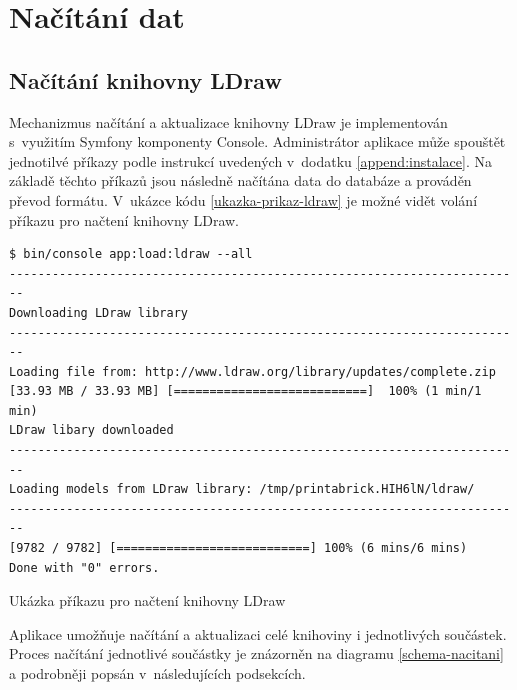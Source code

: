 \section{Načítání dat}

\subsection{Načítání knihovny LDraw}
Mechanizmus načítání a aktualizace knihovny LDraw je implementován s~využitím Symfony komponenty Console. Administrátor aplikace může spouštět jednotilvé příkazy podle instrukcí uvedených v~dodatku \ref{append:instalace}. Na základě těchto příkazů jsou následně načítána data do databáze a prováděn převod formátu. V~ukázce kódu \ref{ukazka-prikaz-ldraw} je možné vidět volání příkazu pro načtení knihovny LDraw.

\begin{listing}[htbp]
        \begin{verbatim}
$ bin/console app:load:ldraw --all
------------------------------------------------------------------------
Downloading LDraw library
------------------------------------------------------------------------
Loading file from: http://www.ldraw.org/library/updates/complete.zip
[33.93 MB / 33.93 MB] [===========================]  100% (1 min/1 min)
LDraw libary downloaded
------------------------------------------------------------------------
Loading models from LDraw library: /tmp/printabrick.HIH6lN/ldraw/
------------------------------------------------------------------------
[9782 / 9782] [===========================] 100% (6 mins/6 mins) 
Done with "0" errors.
        \end{verbatim}
    \caption{Ukázka příkazu pro načtení knihovny LDraw\label{ukazka-prikaz-ldraw}}
\end{listing}

Aplikace umožňuje načítání a aktualizaci celé knihoviny i jednotlivých součástek. Proces načítání jednotlivé součástky je znázorněn na diagramu \ref{schema-nacitani} a podrobněji popsán v~následujících podsekcích.

